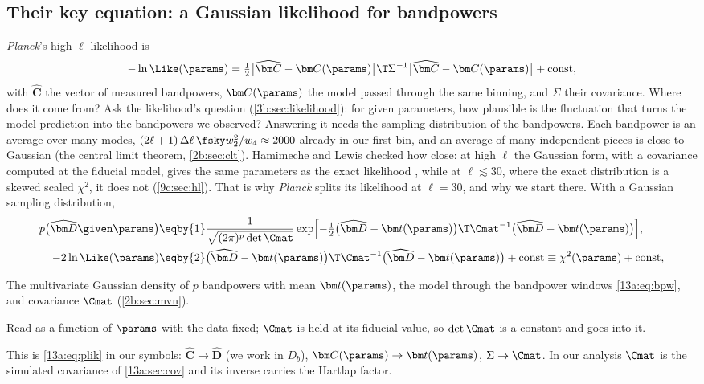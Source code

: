 \subsection{Their key equation: a Gaussian likelihood for bandpowers}
\label{13a:sec:gauss-like}

\textit{Planck}'s high-$\ell$ likelihood is \cite[(20)]{Planck2018V}
\begin{equation}
  -\ln\Like(\params)=\tfrac12\bigl[\widehat{\bm C}-\bm C(\params)\bigr]\T\Sigma^{-1}\bigl[\widehat{\bm C}-\bm C(\params)\bigr]+\text{const},
  \label{13a:eq:plik}
\end{equation}
with $\widehat{\bm C}$ the vector of measured bandpowers, $\bm C(\params)$ the model passed through the same binning,
and $\Sigma$ their covariance. Where does it come from? Ask the likelihood's question
(\cref{3b:sec:likelihood}): for given parameters, how plausible is the fluctuation that turns the model
prediction into the bandpowers we observed? Answering it needs the sampling distribution of the bandpowers.
Each bandpower is an average over many modes, $(2\ell+1)\,\Delta\ell\,\fsky w_2^2/w_4\approx2000$ already in our
first bin, and an average of many independent pieces is close to Gaussian (the central limit theorem,
\cref{2b:sec:clt}). Hamimeche and Lewis checked how close: at high $\ell$ the Gaussian form, with a
covariance computed at the fiducial model, gives the same parameters as the exact likelihood
\cite{HamimecheLewis2008}, while at $\ell\lesssim30$, where the exact distribution is a skewed scaled $\chi^2$, it does
not (\cref{9c:sec:hl}). That is why \textit{Planck} splits its likelihood at $\ell=30$, and why we start there. With a
Gaussian sampling distribution,
\begin{align}
  p\bigl(\widehat{\bm D}\given\params\bigr)
  &\eqby{1}\frac{1}{\sqrt{(2\pi)^p\det\Cmat}}\exp\Bigl[-\tfrac12\bigl(\widehat{\bm D}-\bm t(\params)\bigr)\T\Cmat^{-1}\bigl(\widehat{\bm D}-\bm t(\params)\bigr)\Bigr],
  \nonumber\\
  -2\ln\Like(\params)
  &\eqby{2}\bigl(\widehat{\bm D}-\bm t(\params)\bigr)\T\Cmat^{-1}\bigl(\widehat{\bm D}-\bm t(\params)\bigr)+\text{const}
  \equiv\chi^2(\params)+\text{const},
  \label{13a:eq:like}
\end{align}
\begin{explain}
  \item The multivariate Gaussian density of $p$ bandpowers with mean $\bm t(\params)$, the model through the
        bandpower windows \eqref{13a:eq:bpw}, and covariance $\Cmat$ (\cref{2b:sec:mvn}).
  \item Read as a function of $\params$ with the data fixed; $\Cmat$ is held at its fiducial value, so
        $\det\Cmat$ is a constant and goes into it.
\end{explain}
This is \eqref{13a:eq:plik} in our symbols: $\widehat{\bm C}\to\widehat{\bm D}$ (we work in $D_b$), $\bm C(\params)\to\bm t(\params)$,
$\Sigma\to\Cmat$. In our analysis $\Cmat$ is the simulated covariance of \cref{13a:sec:cov} and its inverse carries the
Hartlap factor.

